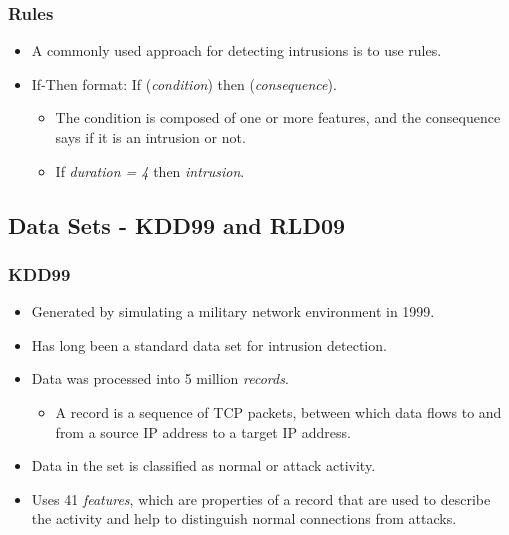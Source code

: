 \documentclass{beamer}
\newcommand{\linespace}{\vskip 0.25cm}
\begin{document}
\begin{frame}
  \frametitle{Rules}
	\begin{itemize}
		\item A commonly used approach for detecting intrusions is to use rules.
		\item If-Then format: If (\emph{condition}) then (\emph{consequence}).
		\begin{itemize}
			\item The condition is composed of one or more features, and the consequence says if it is an intrusion or not.
			\item If \emph{duration = 4} then \emph{intrusion}.
		\end{itemize}				
	\end{itemize}
\end{frame}



\subsection{Data Sets - KDD99 and RLD09}
\begin{frame}
  \frametitle{KDD99}
	\begin{itemize}
		\item Generated by simulating a military network environment in 1999.
		\item Has long been a standard data set for intrusion detection.
		
\linespace		
		
		\item Data was processed into 5 million \emph{records}.
			\begin{itemize}
				\item A record is a sequence of TCP packets, between which data flows to and from a source IP address to a target IP address.
			\end{itemize}
		\item Data in the set is classified as normal or attack activity.

\linespace

		\item Uses 41 \emph{features}, which are properties of a record that are used to describe the activity and help to distinguish normal connections from attacks.

	\end{itemize}
\end{frame}
\end{document}
